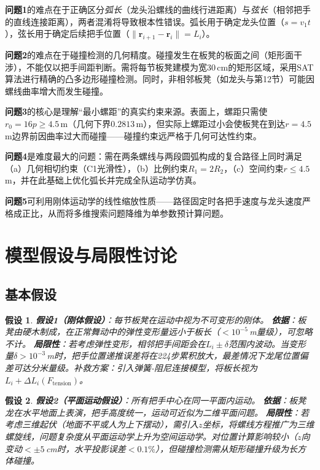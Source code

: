 \documentclass[12pt]{ctexart}
\newtheorem{assumption}{假设}
\begin{document}
\textbf{问题1}的难点在于正确区分\emph{弧长}（龙头沿螺线的曲线行进距离）与\emph{弦长}（相邻把手的直线连接距离），两者混淆将导致根本性错误。弧长用于确定龙头位置（$s=v_1 t$），弦长用于确定后续把手位置（$\|\bm{r}_{i+1}-\bm{r}_i\|=L_i$）。

\textbf{问题2}的难点在于碰撞检测的几何精度。碰撞发生在板凳的板面之间（矩形面干涉），不能仅以把手间距判断。需将每节板凳建模为宽30\,cm的矩形区域，采用SAT算法进行精确的凸多边形碰撞检测。同时，非相邻板凳（如龙头与第12节）可能因螺线曲率增大而发生碰撞。

\textbf{问题3}的核心是理解``最小螺距''的真实约束来源。表面上，螺距只需使$r_0=16p\ge 4.5$\,m（几何下界$0.2813$\,m），但实际上螺距过小会使板凳在到达$r=4.5$\,m边界前因曲率过大而碰撞——碰撞约束远严格于几何可达性约束。

\textbf{问题4}是难度最大的问题：需在两条螺线与两段圆弧构成的复合路径上同时满足（a）几何相切约束（C1光滑性），（b）比例约束$R_1=2R_2$，（c）空间约束$r\le 4.5$\,m，并在此基础上优化弧长并完成全队运动学仿真。

\textbf{问题5}可利用刚体运动学的线性缩放性质——路径固定时各把手速度与龙头速度严格成正比，从而将多维搜索问题降维为单参数预计算问题。

\FloatBarrier

\section{模型假设与局限性讨论}

\subsection{基本假设}

\begin{assumption}
\textbf{假设1（刚体假设）}：每节板凳在运动中视为不可变形的刚体。
\textbf{依据}：板凳由硬木制成，在正常舞动中的弹性变形量远小于板长（$<10^{-5}$\,m量级），可忽略不计。
\textbf{局限性}：若考虑弹性变形，相邻把手间距会在$L_i\pm\delta$范围内波动。当变形量$\delta>10^{-3}$\,m时，把手位置递推误差将在224步累积放大，最差情况下龙尾位置偏差可达分米量级。补救方案：引入弹簧-阻尼连接模型，将板长视为$L_i+\Delta L_i(F_{\text{tension}})$。
\end{assumption}

\begin{assumption}
\textbf{假设2（平面运动假设）}：所有把手中心在同一平面内运动。
\textbf{依据}：板凳龙在水平地面上表演，把手高度统一，运动可近似为二维平面问题。
\textbf{局限性}：若考虑三维起伏（地面不平或人为上下摆动），需引入$z$坐标，将螺线方程推广为三维螺旋线，问题复杂度从平面运动学上升为空间运动学。对位置计算影响较小（$z$向变动$<\pm 5$\,cm时，水平投影误差$<0.1\%$），但碰撞检测需从矩形碰撞升级为长方体碰撞。
\end{assumption}
\end{document}
